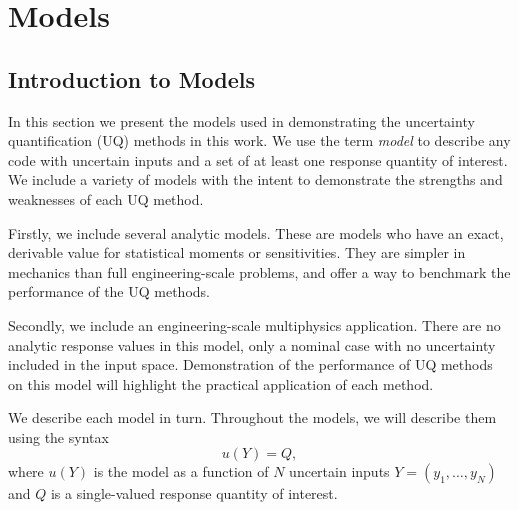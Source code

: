 
\chapter{Models} %

\label{Chapter2} %



\section{Introduction to Models}
In this section we present the models used in demonstrating the uncertainty quantification (UQ) methods in this
work.  We use the term \emph{model} to describe any code with uncertain inputs and a set of at least one
response quantity of interest.
We include a variety of models with the intent to demonstrate the strengths and weaknesses of each UQ
method.

Firstly, we include several analytic models.  These are models who have an exact, derivable value for
statistical moments or sensitivities.  They are simpler in mechanics than full engineering-scale problems, and
offer a way to benchmark the performance of the UQ methods.

Secondly, we include an engineering-scale multiphysics application.  There are no analytic response values in
this model, only a nominal case with no uncertainty included in the input space.  Demonstration of the
performance of UQ methods on this model will highlight the practical application of each method.

We describe each model in turn.  Throughout the models, we will describe them using the syntax
\begin{equation}
  u(Y) = Q,
\end{equation}
where $u(Y)$ is the model as a function of $N$ uncertain inputs $Y=(y_1,\ldots,y_N)$ and $Q$ is a
single-valued response quantity of interest.



